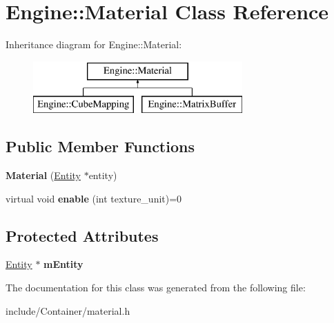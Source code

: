 \hypertarget{classEngine_1_1Material}{}\section{Engine\+:\+:Material Class Reference}
\label{classEngine_1_1Material}
Inheritance diagram for Engine\+:\+:Material\+:\begin{figure}[H]
\begin{center}
\leavevmode
\includegraphics[height=2.000000cm]{classEngine_1_1Material}
\end{center}
\end{figure}
\subsection*{Public Member Functions}
\begin{DoxyCompactItemize}
\item 
\hypertarget{classEngine_1_1Material_aaca068d634155c8c038d9e398a4820c2}{}{\bfseries Material} (\hyperlink{classEngine_1_1Entity}{Entity} $\ast$entity)\label{classEngine_1_1Material_aaca068d634155c8c038d9e398a4820c2}

\item 
\hypertarget{classEngine_1_1Material_a8a51ad4fb9347e1ce720bfbbb37fafa0}{}virtual void {\bfseries enable} (int texture\+\_\+unit)=0\label{classEngine_1_1Material_a8a51ad4fb9347e1ce720bfbbb37fafa0}

\end{DoxyCompactItemize}
\subsection*{Protected Attributes}
\begin{DoxyCompactItemize}
\item 
\hypertarget{classEngine_1_1Material_a1e5cc0152e801d6177f47d92e763fab1}{}\hyperlink{classEngine_1_1Entity}{Entity} $\ast$ {\bfseries m\+Entity}\label{classEngine_1_1Material_a1e5cc0152e801d6177f47d92e763fab1}

\end{DoxyCompactItemize}


The documentation for this class was generated from the following file\+:\begin{DoxyCompactItemize}
\item 
include/\+Container/material.\+h\end{DoxyCompactItemize}
